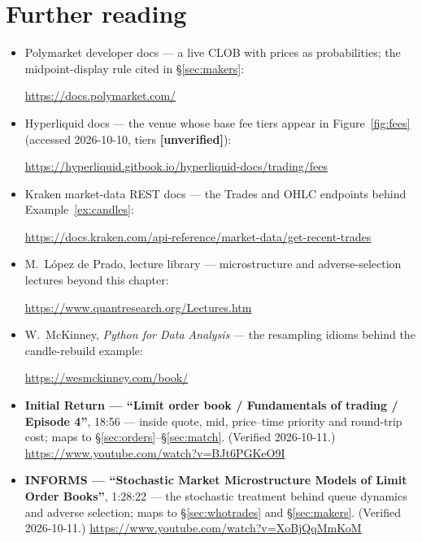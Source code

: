 \section*{Further reading}
\begin{itemize}
\item Polymarket developer docs --- a live CLOB with prices as
probabilities; the midpoint-display rule cited in \S\ref{sec:makers}:

\url{https://docs.polymarket.com/}

\item Hyperliquid docs --- the venue whose base fee tiers appear in
Figure~\ref{fig:fees} (accessed 2026-10-10, tiers
\textbf{[unverified]}):

\url{https://hyperliquid.gitbook.io/hyperliquid-docs/trading/fees}

\item Kraken market-data REST docs --- the Trades and OHLC endpoints
behind Example~\ref{ex:candles}:

\url{https://docs.kraken.com/api-reference/market-data/get-recent-trades}

\item M.~L\'opez de Prado, lecture library --- microstructure and
adverse-selection lectures beyond this chapter:

\url{https://www.quantresearch.org/Lectures.htm}

\item W.~McKinney, \emph{Python for Data Analysis} --- the resampling
idioms behind the candle-rebuild example:

\url{https://wesmckinney.com/book/}
\end{itemize}

\begin{rulebox}
\begin{itemize}
\item \textbf{Initial Return --- ``Limit order book / Fundamentals
of trading / Episode 4''}, 18:56 --- inside quote, mid, price--time
priority and round-trip cost; maps to
\S\ref{sec:orders}--\S\ref{sec:match}. (Verified 2026-10-11.)
\url{https://www.youtube.com/watch?v=BJt6PGKeO9I}
\item \textbf{INFORMS --- ``Stochastic Market Microstructure Models
of Limit Order Books''}, 1:28:22 --- the stochastic treatment behind
queue dynamics and adverse selection; maps to
\S\ref{sec:whotrades} and \S\ref{sec:makers}. (Verified 2026-10-11.)
\url{https://www.youtube.com/watch?v=XoBjQqMmKoM}
\end{itemize}
\end{rulebox}
